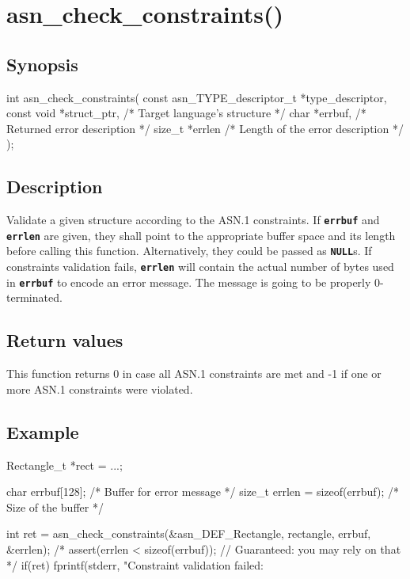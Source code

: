 \documentclass[english,oneside,12pt]{book}
\newcommand{\apisection}[2]{\clearpage\section{\label{#1}#2}}
\newcommand{\code}[1]{\texttt{\textbf{\lstinline{#1}}}}
\begin{document}
\apisection{sec:asn_check_constraints}{asn\_check\_constraints()}

\subsection*{Synopsis}

\begin{signature}
int asn_check_constraints(
    const asn_TYPE_descriptor_t *type_descriptor,
    const void *struct_ptr, /* Target language's structure */
    char *errbuf,           /* Returned error description */
    size_t *errlen          /* Length of the error description */
);
\end{signature}

\subsection*{Description}

Validate a given structure according to the ASN.1 constraints.
If \code{errbuf} and \code{errlen} are given, they shall point to the
appropriate buffer space and its length before calling this function.
Alternatively, they could be passed as \code{NULL}s.
If constraints validation fails, \code{errlen} will contain the actual
number of bytes used in \code{errbuf} to encode an error message.
The message is going to be properly 0-terminated.

\subsection*{Return values}

This function returns 0 in case all ASN.1 constraints are met
and -1 if one or more ASN.1 constraints were violated.

\subsection*{Example}

\begin{codesample}[basicstyle=\scriptsize\listingfont]
Rectangle_t *rect = ...;

char errbuf[128];  /* Buffer for error message */
size_t errlen = sizeof(errbuf);  /* Size of the buffer */

int ret = asn_check_constraints(&asn_DEF_Rectangle, rectangle, errbuf, &errlen);
/* assert(errlen < sizeof(errbuf)); // Guaranteed: you may rely on that */
if(ret) {
    fprintf(stderr, "Constraint validation failed: %
}
\end{codesample}
\end{document}
